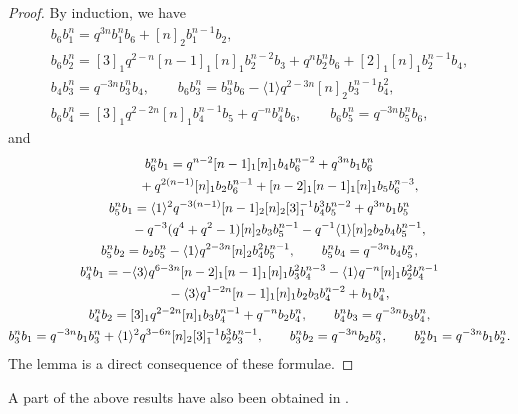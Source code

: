 \documentclass[pdftex]{sigma}
\def\qmq#1{\langle #1 \rangle}
\begin{document}
\begin{proof} By induction, we have
\begin{gather*}
 b_6 b_1^n = q^{3 n} b_1^n b_6+[n]_2 b_1^{n-1} b_2,\\
 b_6 b_2^n = [3]_1 q^{2-n} [n-1]_1 [n]_1 b_2^{n-2} b_3+q^n b_2^n b_6+[2]_1 [n]_1 b_2^{n-1} b_4,\\
 b_4 b_3^n = q^{-3 n} b_3^n b_4,\qquad
 b_6 b_3^n = b_3^n b_6-\qmq{1} q^{2-3 n} [n]_2 b_3^{n-1} b_4^2,\\
 b_6 b_4^n = [3]_1 q^{2-2 n} [n]_1 b_4^{n-1} b_5+q^{-n} b_4^n b_6, \qquad
 b_6 b_5^n = q^{-3 n} b_5^n b_6,
 \end{gather*}
and
\begin{gather*}
 b_6^n b_1 = q^{n-2} [n-1]_1 [n]_1 b_4 b_6^{n-2}+q^{3 n} b_1 b_6^n \\
\hphantom{b_6^n b_1 =}{}
 +q^{2 (n-1)} [n]_1 b_2 b_6^{n-1}+[n-2]_1 [n-1]_1 [n]_1 b_5 b_6^{n-3},\\
 b_5^n b_1 = \qmq{1}^2 q^{-3 (n-1)} [n-1]_2 [n]_2 [3]_1^{-1}b_4^3 b_5^{n-2}+q^{3 n} b_1 b_5^n\\
\hphantom{b_5^n b_1 =}{}
 -q^{-3}(q^4+q^2-1) [n]_2 b_3 b_5^{n-1}-q^{-1}\qmq{1} [n]_2 b_2 b_4 b_5^{n-1},\\
 b_5^n b_2 = b_2 b_5^n-\qmq{1} q^{2-3 n} [n]_2 b_4^2 b_5^{n-1},\qquad
 b_5^n b_4 = q^{-3 n} b_4 b_5^n,\\
 b_4^n b_1 = -\qmq{3} q^{6-3 n} [n-2]_1 [n-1]_1 [n]_1 b_3^2 b_4^{n-3}-\qmq{1} q^{-n} [n]_1b_2^2 b_4^{n-1}\\
\hphantom{b_4^n b_1 =}{}
 -\qmq{3} q^{1-2 n} [n-1]_1 [n]_1 b_2 b_3 b_4^{n-2}+b_1 b_4^n,\\
 b_4^n b_2 = [3]_1 q^{2-2 n} [n]_1 b_3 b_4^{n-1}+q^{-n} b_2 b_4^n,\qquad
 b_4^n b_3 = q^{-3 n} b_3 b_4^n,\\
 b_3^n b_1 = q^{-3 n} b_1 b_3^n+\qmq{1}^2 q^{3-6 n} [n]_2 [3]_1^{-1}b_2^3 b_3^{n-1},\qquad
 b_3^n b_2 = q^{-3 n} b_2 b_3^n,\qquad
 b_2^n b_1 = q^{-3 n} b_1 b_2^n.
\end{gather*}
The lemma is a direct consequence of these formulae.
\end{proof}

A part of the above results have also been obtained in \cite{Xi95}.
\end{document}
